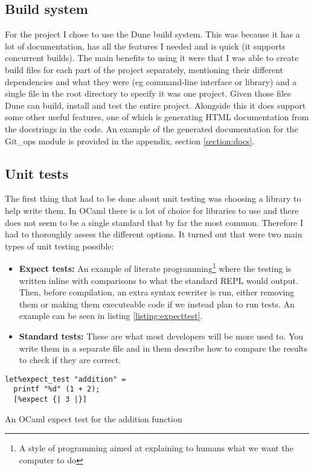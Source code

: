 \subsection{Build system}

For the project I chose to use the Dune\cite{code_dune} build system. This was because it has a lot of documentation, has all the features I needed and is quick (it supports concurrent builds). The main benefits to using it were that I was able to create build files for each part of the project separately, mentioning their different dependencies and what they were (eg command-line interface or library) and a single file in the root directory to specify it was one project. Given those files Dune can build, install and test the entire project. Alongside this it does support some other useful features, one of which is generating HTML documentation from the docstrings in the code. An example of the generated documentation for the Git\_ops module is provided in the appendix, section \ref{section:docs}.

\subsection{Unit tests}

The first thing that had to be done about unit testing was choosing a library to help write them. In OCaml there is a lot of choice for libraries to use and there does not seem to be a single standard that by far the most common. Therefore I had to thoroughly assess the different options. It turned out that were two main types of unit testing possible:
\begin{itemize}
  \item \textbf{Expect tests:} An example of literate programming\footnote{A style of programming aimed at explaining to humans what we want the computer to do\cite{Knuth1984}} where the testing is written inline with comparisons to what the standard REPL would output. Then, before compilation, an extra syntax rewriter is run, either removing them or making them executeable code if we instead plan to run tests. An example can be seen in listing \ref{listing:expecttest}.
  \item \textbf{Standard tests:} These are what most developers will be more used to. You write them in a separate file and in them describe how to compare the results to check if they are correct.
\end{itemize}

\begin{listing}[h]
\begin{verbatim}
let%expect_test "addition" =
  printf "%d" (1 + 2);
  [%expect {| 3 |}]
\end{verbatim}
\caption{An OCaml expect test for the addition function}
\label{listing:expecttest}
\end{listing}

